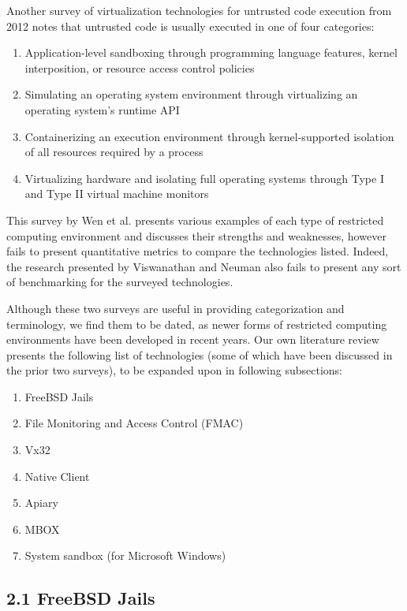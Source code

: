 \documentclass{proc}
\begin{document}
Another survey of virtualization technologies for untrusted code execution from 2012 \cite{wen2012virtualization} notes that untrusted code is usually executed in one of four categories:
\begin{enumerate}
    \item Application-level sandboxing through programming language features, kernel interposition, or resource access control policies
    \item Simulating an operating system environment through virtualizing an operating system's runtime API
    \item Containerizing an execution environment through kernel-supported isolation of all resources required by a process
    \item Virtualizing hardware and isolating full operating systems through Type I and Type II virtual machine monitors
\end{enumerate}
This survey by Wen et al. presents various examples of each type of restricted computing environment and discusses their strengths and weaknesses, however fails to present quantitative metrics to compare the technologies listed. Indeed, the research presented by Viswanathan and Neuman \cite{viswanathan2009isolation} also fails to present any sort of benchmarking for the surveyed technologies.

Although these two surveys are useful in providing categorization and terminology, we find them to be dated, as newer forms of restricted computing environments have been developed in recent years. Our own literature review presents the following list of technologies (some of which have been discussed in the prior two surveys), to be expanded upon in following subsections:
\begin{enumerate}
    \item FreeBSD Jails \cite{kamp2000jails}
    \item File Monitoring and Access Control (FMAC) \cite{prevelakis2001fmac}
    \item Vx32 \cite{ford2008vx32}
    \item Native Client \cite{yee2009native}
    \item Apiary \cite{potter2010apiary}
    \item MBOX \cite{kim2013mbox}
    \item System sandbox (for Microsoft Windows) \cite{vokorokos2015sandboxMSWIN}
\end{enumerate}

\subsection*{2.1 FreeBSD Jails}
\end{document}
